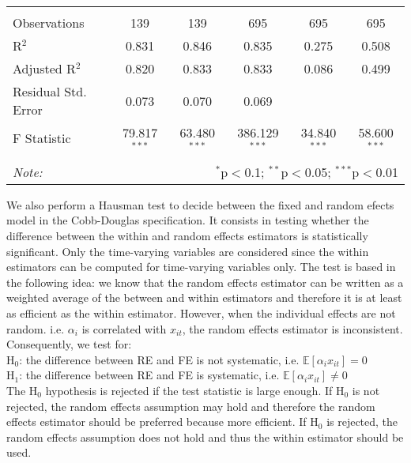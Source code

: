 \documentclass[12pt,a4paper]{article}\usepackage[]{graphicx}\usepackage[]{color}
\begin{document}
\begin{table}[!htbp]
\begin{tabular}{@{\extracolsep{5pt}}lccccc}
\hline \\[-1.8ex] 
Observations & 139 & 139 & 695 & 695 & 695 \\ 
R$^{2}$ & 0.831 & 0.846 & 0.835 & 0.275 & 0.508 \\ 
Adjusted R$^{2}$ & 0.820 & 0.833 & 0.833 & 0.086 & 0.499 \\ 
Residual Std. Error & 0.073 & 0.070 & 0.069 &  &  \\ 
F Statistic & 79.817$^{***}$ & 63.480$^{***}$ & 386.129$^{***}$ & 34.840$^{***}$ & 58.600$^{***}$ \\ 
\hline 
\hline \\[-1.8ex] 
\textit{Note:}  & \multicolumn{5}{r}{$^{*}$p$<$0.1; $^{**}$p$<$0.05; $^{***}$p$<$0.01} \\ 
\end{tabular} 
\end{table} 


We also perform a Hausman test to decide between the fixed and random efects model in the Cobb-Douglas specification. It consists in testing whether the difference between the within and random effects estimators is statistically significant. Only the time-varying variables are considered since the within estimators can be computed for time-varying variables only. The test is based in the following idea: we know that the random effects estimator can be written as a weighted average of the between and within estimators and therefore it is at least as efficient as the within estimator. However, when the individual effects are not random. i.e. $\alpha_i$ is correlated with $x_{it}$, the random effects estimator is inconsistent. Consequently, we test for: \\
\hspace*{0.3cm}$\text{H}_0$: the difference between RE and FE is not systematic, i.e. $\mathbb{E}[\alpha_i x_{it}]=0$ \\
\hspace*{0.3cm}$\text{H}_1$: the difference between RE and FE is systematic, i.e. $\mathbb{E}[\alpha_i x_{it}]\neq 0$ \\
The $\text{H}_0$ hypothesis is rejected if the test statistic is large enough. If $\text{H}_0$ is not rejected, the random effects assumption may hold and therefore the random effects estimator should be preferred because more efficient. If $\text{H}_0$ is rejected, the random effects assumption does not hold and thus the within estimator should be used.
\end{document}
